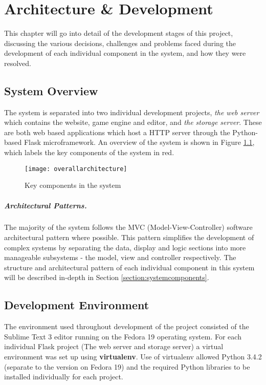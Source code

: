 \chapter{Architecture \& Development}
This chapter will go into detail of the development stages of this project, discussing the various decisions, challenges and problems faced during the development of each individual component in the system, and how they were resolved.

\section{System Overview}
The system is separated into two individual development projects, \emph{the web server} which contains the website, game engine and editor, and \emph{the storage server}. These are both web based applications which host a HTTP server through the Python-based Flask microframework. An overview of the system is shown in Figure \ref{fig:overallarchitecture}, which labels the key components of the system in red.

\begin{figure}[h]
	\centering
	\texttt{[image: overallarchitecture]}
	\caption{Key components in the system}
	\label{fig:overallarchitecture}
\end{figure}

\paragraph{Architectural Patterns.}
The majority of the system follows the MVC (Model-View-Controller) software architectural pattern where possible. This pattern simplifies the development of complex systems by separating the data, display and logic sections into more manageable subsystems - the model, view and controller respectively. The structure and architectural pattern of each individual component in this system will be described in-depth in Section \ref{section:systemcomponents}.

\section{Development Environment}
The environment used throughout development of the project consisted of the Sublime Text 3 editor running on the Fedora 19 operating system. For each individual Flask project (The web server and storage server) a virtual environment was set up using \textbf{virtualenv}. Use of virtualenv allowed Python 3.4.2 (separate to the version on Fedora 19) and the required Python libraries to be installed individually for each project.

